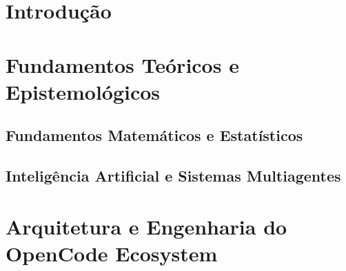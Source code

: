 \documentclass[11pt,fleqn,oneside]{book}
\theoremstyle{definition}
\begin{document}
\coverpage{\TITLE}{\SUBTITLE}{\AUTHOR}{\DATE}{\SUBJECT}

\frontmatter

\newpage
\tableofcontents
\cleardoublepage



\newpage
\listoffigures
\newpage
\listoftables
\newpage
\lstlistoflistings
\cleardoublepage

\mainmatter

\part{Introdução}


\part{Fundamentos Teóricos e Epistemológicos}
\newpage
\chapter{Fundamentos Matemáticos e Estatísticos}
\label{ch:fundamentos-mat}


\newpage
\chapter{Inteligência Artificial e Sistemas Multiagentes}
\label{ch:ia-agentes}


\part{Arquitetura e Engenharia do OpenCode Ecosystem}
\newpage
\end{document}
